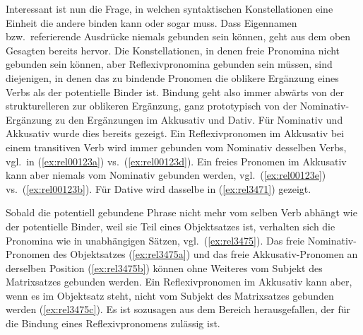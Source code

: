 
Interessant ist nun die Frage, in welchen syntaktischen Konstellationen eine Einheit die andere binden kann oder sogar muss.
Dass Eigennamen bzw.\ referierende Ausdrücke niemals gebunden sein können, geht aus dem oben Gesagten bereits hervor.
Die Konstellationen, in denen freie Pronomina nicht gebunden sein können, aber Reflexivpronomina gebunden sein müssen, sind diejenigen, in denen das zu bindende Pronomen die oblikere Ergänzung eines Verbs als der potentielle Binder ist.
Bindung geht also immer abwärts von der strukturelleren zur oblikeren Ergänzung, ganz prototypisch von der Nominativ-Ergänzung zu den Ergänzungen im Akkusativ und Dativ.
Für Nominativ und Akkusativ wurde dies bereits gezeigt.
Ein Reflexivpronomen im Akkusativ bei einem transitiven Verb wird immer gebunden vom Nominativ desselben Verbs, vgl.\ in (\ref{ex:rel00123a}) vs.\ (\ref{ex:rel00123d}).
Ein freies Pronomen im Akkusativ kann aber niemals vom Nominativ gebunden werden, vgl.\ (\ref{ex:rel00123e}) vs.\ (\ref{ex:rel00123b}).
Für Dative wird dasselbe in (\ref{ex:rel3471}) gezeigt.

\begin{exe}
  \ex\label{ex:rel3471}
  \begin{xlist}
  \end{xlist}
\end{exe}

Sobald die potentiell gebundene Phrase nicht mehr vom selben Verb abhängt wie der potentielle Binder, weil sie \zB Teil eines Objektsatzes ist, verhalten sich die Pronomina wie in unabhängigen Sätzen, vgl.\ (\ref{ex:rel3475}).
Das freie Nominativ-Pronomen des Objektsatzes (\ref{ex:rel3475a}) und das freie Akkusativ-Pronomen an derselben Position (\ref{ex:rel3475b}) können ohne Weiteres vom Subjekt des Matrixsatzes gebunden werden.
Ein Reflexivpronomen im Akkusativ kann aber, wenn es im Objektsatz steht, nicht vom Subjekt des Matrixsatzes gebunden werden (\ref{ex:rel3475c}).
Es ist sozusagen aus dem Bereich herausgefallen, der für die Bindung eines Reflexivpronomens zulässig ist.

\Enl

\begin{exe}
  \ex\label{ex:rel3475}
  \begin{xlist}
  \end{xlist}
\end{exe}

